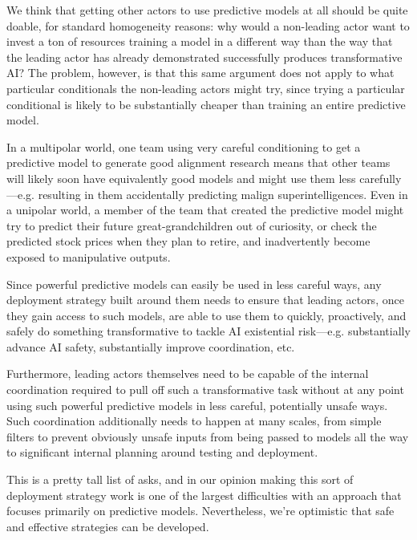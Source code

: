 {{We think that getting other actors to use predictive models at all should be quite doable, for standard homogeneity\cite{TODO: cite https://www.alignmentforum.org/posts/mKBfa8v4S9pNKSyKK/homogeneity-vs-heterogeneity-in-ai-takeoff-scenarios} reasons: why would a non-leading actor want to invest a ton of resources training a model in a different way than the way that the leading actor has already demonstrated successfully produces transformative AI? The problem, however, is that this same argument does not apply to what particular conditionals the non-leading actors might try, since trying a particular conditional is likely to be substantially cheaper than training an entire predictive model.

In a multipolar world, one team using very careful conditioning to get a predictive model to generate good alignment research means that other teams will likely soon have equivalently good models and might use them less carefully---e.g. resulting in them accidentally predicting malign superintelligences. Even in a unipolar world, a member of the team that created the predictive model might try to predict their future great-grandchildren out of curiosity, or check the predicted stock prices when they plan to retire, and inadvertently become exposed to manipulative outputs.

Since powerful predictive models can easily be used in less careful ways, any deployment strategy built around them needs to ensure that leading actors, once they gain access to such models, are able to use them to quickly, proactively, and safely do something transformative to tackle AI existential risk---e.g. substantially advance AI safety, substantially improve coordination, etc.

Furthermore, leading actors themselves need to be capable of the internal coordination required to pull off such a transformative task without at any point using such powerful predictive models in less careful, potentially unsafe ways. Such coordination additionally needs to happen at many scales, from simple filters to prevent obviously unsafe inputs from being passed to models all the way to significant internal planning around testing and deployment.

This is a pretty tall list of asks, and in our opinion making this sort of deployment strategy work is one of the largest difficulties with an approach that focuses primarily on predictive models. Nevertheless, we're optimistic that safe and effective strategies can be developed.


}}
